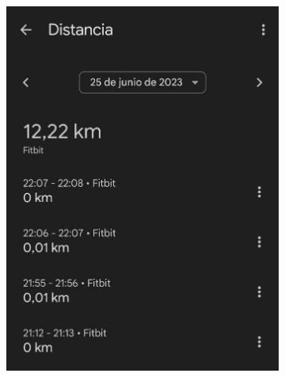         \begin{figure}[h]
            \begin{subfigure}[b]{0.49\textwidth}
                \includegraphics[width=1\linewidth]{figures/Health Connect lectura datos.jpg}
            \end{subfigure}
            \hfill
            \begin{subfigure}[b]{0.49\textwidth}

\end{subfigure}
\end{figure}
